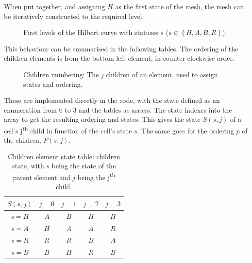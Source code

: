 When put together, and assigning $H$ as the first state of the mesh, the mesh can be iteratively
constructed to the required level.

\begin{figure}[H]
	\centering
	\subfloat[Level 0]
	{ \label{fig:hilbert_l0}}
	\hfill
	\subfloat[Level 1]
	{ \label{fig:hilbert_l1}}
	\hfill
	\subfloat[Level 2]
	{ \label{fig:hilbert_l2}}
	\caption{First levels of the Hilbert curve with statuses $s$ ($s \in \left \{ H, A , B , R \right \}$).}
	\label{fig:hilbert_levels}
\end{figure}

This behaviour can be summarised in the following tables. The ordering of the children elements is
from the bottom left element, in counter-clockwise order. 

\begin{figure}[H]
	\centering
	
	\caption{Children numbering: The $j$ children of an element, used to assign states and ordering.}
	\label{fig:child_order}
\end{figure}

These are implemented directly in the code, with the state defined as an enumeration from 0 to 3 and
the tables as arrays. The state indexes into the array to get the resulting ordering and states.
This gives the state $S(s, j)$ of a cell's j\textsuperscript{th} child in function of the cell's
state $s$. The same goes for the ordering $p$ of the children, $P(s, j)$.

\begin{table}[H]
	\begin{center}
		\begin{tabular}{ c | c c c c} 
			$S\left ( s, j \right )$ & $j = 0$ & $j = 1$ & $j = 2$ & $j = 3$  \\
			\hline
			$s = H$ & \textcolor{vs_red}{$A$} & \textcolor{vs_red}{$B$} & \textcolor{vs_red}{$H$} & \textcolor{vs_red}{$H$} \\ 
			$s = A$ & \textcolor{vs_blue}{$H$} & \textcolor{vs_blue}{$A$} & \textcolor{vs_blue}{$A$} & \textcolor{vs_blue}{$R$} \\
			$s = R$ & \textcolor{vs_teal}{$R$} & \textcolor{vs_teal}{$R$} & \textcolor{vs_teal}{$B$} & \textcolor{vs_teal}{$A$} \\
			$s = B$ & \textcolor{vs_plum}{$B$} & \textcolor{vs_plum}{$H$} & \textcolor{vs_plum}{$R$} & \textcolor{vs_plum}{$B$} \\
		\end{tabular}
	
		\caption{Children element state table: children state, with $s$ being the state of the parent element and $j$ being the j\textsuperscript{th} child.}
		\label{table:children_state}
	\end{center}
\end{table}

